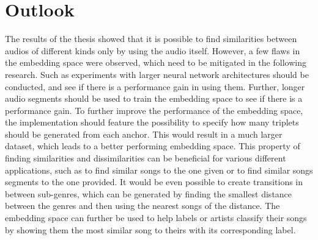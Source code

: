 \section{Outlook}
\label{sec:Outlook}
The results of the thesis showed that it is possible to find similarities between audios of different kinds only by using the audio itself. However, a few flaws in the embedding space were observed, which need to be mitigated in the following research. Such as experiments with larger neural network architectures should be conducted, and see if there is a performance gain in using them. Further, longer audio segments should be used to train the embedding space to see if there is a performance gain. To further improve the performance of the embedding space, the implementation should feature the possibility to specify how many triplets should be generated from each anchor. This would result in a much larger dataset, which leads to a better performing embedding space.
\newline
\newline
This property of finding similarities and dissimilarities can be beneficial for various different applications, such as to find similar songs to the one given or to find similar songs segments to the one provided. It would be even possible to create transitions in between sub-genres, which can be generated by finding the smallest distance between the genres and then using the nearest songs of the distance. The embedding space can further be used to help labels or artists classify their songs by showing them the most similar song to theirs with its corresponding label. 
